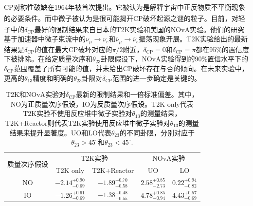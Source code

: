 \documentclass[a4paper,zihao=-4]{article}
\newcommand{\citess}[1]{\textsuperscript{\cite{#1}}}
\begin{document}
\paragraph{}CP对称性破缺在1964年被首次提出\citess{Christenson:1964fg}。它被认为是解释宇宙中正反物质不平衡现象的必要条件\citess{Sakharov:1967dj}。而中微子被认为是很可能揭开CP破坏起源之谜的粒子。目前，对轻子中的$\delta_{\text{CP}}$最好的限制结果来自日本的T2K实验\citess{T2K:2021xwb}和美国的NOvA实验\citess{NOvA:2021nfi}。他们的研究基于加速器中微子束流中的$\nu_\mu\to\nu_e$和$\overline{\nu}_\mu\to\overline{\nu}_e$振荡现象开展。T2K实验给出的最新结果是$\delta_{\text{CP}}$的值在最大CP破坏对应的$\pi/2$附近，$\delta_{\text{CP}}=0$和$\delta_{\text{CP}}=\pi$都在95\%的置信度下被排除。在给定质量次序和$\theta_{23}$卦限假设下，NOvA实验得到的90\%置信水平下的$\delta_{\text{CP}}$范围覆盖了所有可能的值，并未给出CP破坏存在与否的倾向。在未来实验中，更高的$\theta_{13}$精度和明确的$\theta_{23}$卦限对$\delta_{\text{CP}}$范围的进一步确定是关键的。
\begin{table}[htb!]
	\centering
	\setlength{\tabcolsep}{10pt}
	\caption{T2K和NOvA实验对$\delta_{\text{CP}}$最新的限制结果和一倍标准偏差。其中，NO为正质量次序假设，IO为反质量次序假设。T2K only代表T2K实验不使用反应堆中微子实验对$\theta_{13}$的测量结果，T2K+Reactor则代表T2K实验使用反应堆中微子实验对$\theta_{13}$的测量结果来提升显著度。UO和LO代表$\theta_{23}$的不同卦限，分别对应于$\theta_{23}>45^\circ$和$\theta_{23}<45^\circ$.}
	\begin{tabular}{ccccc}
		\toprule
		\multirow{2}{*}{质量次序假设} & \multicolumn{2}{c}{T2K实验} & \multicolumn{2}{c}{NOvA实验} \\ 
		\cmidrule{2-3} \cmidrule{4-5}
	& \multicolumn{1}{c}{T2K only} & \multicolumn{1}{c}{T2K+Reactor} & \multicolumn{1}{c}{UO} & \multicolumn{1}{c}{LO} \\
		\midrule          
		NO & $-2.14^{+0.90}_{-0.69}$ & $-1.89^{+0.70}_{-0.58}$ & $2.58^{+0.85}_{-2.73}$ & $0.22^{+0.94}_{-0.82}$ \\
		IO & $-1.26^{+0.61}_{-0.69}$ & $-1.38^{+0.48}_{-0.55}$ & $4.78^{+0.85}_{-0.94}$ & $4.43^{+0.57}_{-0.69}$ \\
		\bottomrule
	\end{tabular}%
	\label{tab:CP-measurements}%
\end{table}%
\end{document}
